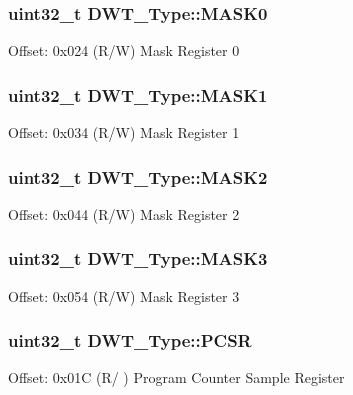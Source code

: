 \subsubsection[{\texorpdfstring{M\+A\+S\+K0}{MASK0}}]{ uint32\+\_\+t D\+W\+T\+\_\+\+Type\+::\+M\+A\+S\+K0}\hypertarget{struct_d_w_t___type_a5bb1c17fc754180cc197b874d3d8673f}{}\label{struct_d_w_t___type_a5bb1c17fc754180cc197b874d3d8673f}
Offset\+: 0x024 (R/W) Mask Register 0 
\subsubsection[{\texorpdfstring{M\+A\+S\+K1}{MASK1}}]{ uint32\+\_\+t D\+W\+T\+\_\+\+Type\+::\+M\+A\+S\+K1}\hypertarget{struct_d_w_t___type_a0c684438a24f8c927e6e01c0e0a605ef}{}\label{struct_d_w_t___type_a0c684438a24f8c927e6e01c0e0a605ef}
Offset\+: 0x034 (R/W) Mask Register 1 
\subsubsection[{\texorpdfstring{M\+A\+S\+K2}{MASK2}}]{ uint32\+\_\+t D\+W\+T\+\_\+\+Type\+::\+M\+A\+S\+K2}\hypertarget{struct_d_w_t___type_a8ecdc8f0d917dac86b0373532a1c0e2e}{}\label{struct_d_w_t___type_a8ecdc8f0d917dac86b0373532a1c0e2e}
Offset\+: 0x044 (R/W) Mask Register 2 
\subsubsection[{\texorpdfstring{M\+A\+S\+K3}{MASK3}}]{ uint32\+\_\+t D\+W\+T\+\_\+\+Type\+::\+M\+A\+S\+K3}\hypertarget{struct_d_w_t___type_ae3f01137a8d28c905ddefe7333547fba}{}\label{struct_d_w_t___type_ae3f01137a8d28c905ddefe7333547fba}
Offset\+: 0x054 (R/W) Mask Register 3 
\subsubsection[{\texorpdfstring{P\+C\+SR}{PCSR}}]{ uint32\+\_\+t D\+W\+T\+\_\+\+Type\+::\+P\+C\+SR}\hypertarget{struct_d_w_t___type_abc5ae11d98da0ad5531a5e979a3c2ab5}{}\label{struct_d_w_t___type_abc5ae11d98da0ad5531a5e979a3c2ab5}
Offset\+: 0x01C (R/ ) Program Counter Sample Register 
